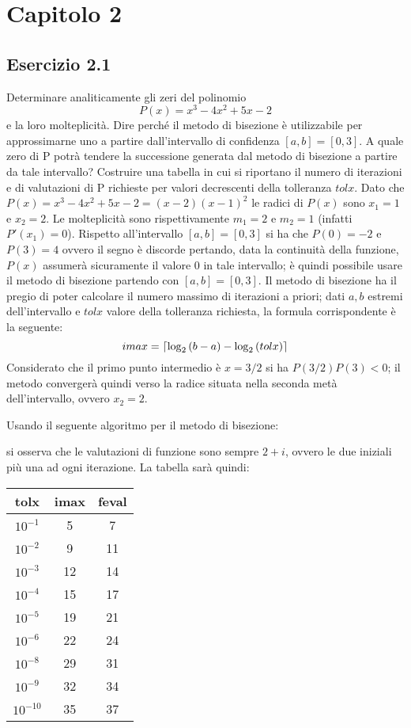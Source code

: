 \section{Capitolo 2}



	\subsection{Esercizio 2.1}

Determinare analiticamente gli zeri del polinomio 
\begin{equation*}
	P(x) = x^3 - 4x^2 + 5x - 2
\end{equation*}
 e la loro molteplicità. Dire perché il metodo di bisezione è utilizzabile per approssimarne uno a partire dall’intervallo di confidenza $[a,b]=[0,3]$. A quale zero di P potrà tendere la successione generata dal metodo di bisezione a partire da tale intervallo? Costruire una tabella in cui si riportano il numero di iterazioni e di valutazioni di P richieste per valori decrescenti della tolleranza $tolx$.
\PP
Dato che $P(x) = x^3 - 4x^2 + 5x - 2 = (x-2)(x-1)^2$ le radici di $P(x)$ sono $x_1=1$ e $x_2=2$. Le molteplicità sono rispettivamente $m_1=2$ e $m_2=1$ (infatti $P'(x_1) = 0$). Rispetto all'intervallo $[a,b]=[0,3]$ si ha che $P(0) = -2$ e $P(3)=4$ ovvero il segno è discorde pertando, data la continuità della funzione, $P(x)$ assumerà sicuramente il valore $0$ in tale intervallo; è quindi possibile usare il metodo di bisezione partendo con $[a,b] = [0,3].$
Il metodo di bisezione ha il pregio di poter calcolare il numero massimo di iterazioni a priori; dati $a,b$ estremi dell'intervallo e $tolx$ valore della tolleranza richiesta, la formula corrispondente è la seguente:
\begin{equation*}
	imax= \lceil\log_2{(b-a)}-\log_2{(tolx)}\rceil
\end{equation*}
Considerato che il primo punto intermedio è $x=3/2$ si ha $P(3/2)P(3)<0$; il metodo convergerà quindi verso la radice situata nella seconda metà dell'intervallo, ovvero $x_2=2$.

Usando il seguente algoritmo per il metodo di bisezione:

si osserva che le valutazioni di funzione sono sempre $2+i$, ovvero le due iniziali più una ad ogni iterazione. La tabella sarà quindi:

\begin{tabular}{ | c | c | c | }
\hline
\textbf{tolx} & \textbf{imax} & \textbf{feval} \\
\hline
$10^{-1}$ & 5 & 7 \\
$10^{-2}$ & 9 & 11 \\
$10^{-3}$ & 12 & 14 \\
$10^{-4}$ & 15 & 17 \\
$10^{-5}$ & 19 & 21 \\
$10^{-6}$ & 22 & 24 \\
$10^{-8}$ & 29 & 31 \\
$10^{-9}$ & 32 & 34 \\
$10^{-10}$ & 35 & 37 \\
\hline
\end{tabular}



